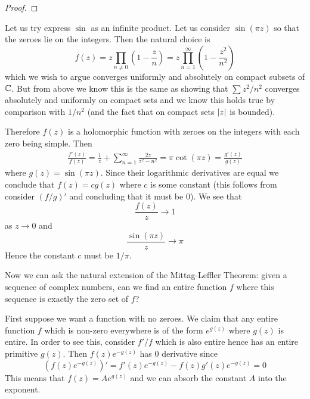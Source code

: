 \begin{proof}
\end{proof}

Let us try express $\sin$ as an infinite product. Let us consider $\sin(\pi z)$ so that the zeroes lie on the integers. Then the natural choice is 
$$f(z) = z\prod_{n \neq 0} \left(1 - \frac{z}{n} \right) = z \prod_{n = 1}^\infty \left( 1 - \frac{z^2}{n^2} \right)$$
which we wish to argue converges uniformly and absolutely on compact subsets of $\mathbb{C}$. But from above we know this is the same as showing that $\sum z^2/n^2$ converges absolutely and uniformly on compact sets and we know this holds true by comparison with $1/n^2$ (and the fact that on compact sets $\left|z\right|$ is bounded).

Therefore $f(z)$ is a holomorphic function with zeroes on the integers with each zero being simple. Then
\begin{align*}
    \frac{f'(z)}{f(z)} = \frac{1}{z} + \sum_{n = 1}^\infty \frac{2z}{z^2 - n^2} = \pi \cot(\pi z) = \frac{g'(z)}{g(z)}
\end{align*}
where $g(z) = \sin (\pi z)$. Since their logarithmic derivatives are equal we conclude that $f(z) = c g(z)$ where $c$ is some constant (this follows from consider $(f/g)'$ and concluding that it must be 0). We see that 
$$\frac{f(z)}{z} \to 1$$
as $z \to 0$ and 
$$\frac{\sin(\pi z)}{z} \to \pi$$
Hence the constant $c$ must be $1/\pi$. 

Now we can ask the natural extension of the Mittag-Leffler Theorem: given a sequence of complex numbers, can we find an entire function $f$ where this sequence is exactly the zero set of $f$? 

First suppose we want a function with no zeroes. We claim that any entire function $f$ which is non-zero everywhere is of the form $e^{g(z)}$ where $g(z)$ is entire. In order to see this, consider $f'/f$ which is also entire hence has an entire primitive $g(z)$. Then $f(z) e^{-g(z)}$ has 0 derivative since 
$$(f(z) e^{-g(z)})' = f'(z) e^{-g(z)}  - f(z) g'(z) e^{-g(z)} = 0$$
This means that $f(z) = A e^{g(z)}$ and we can absorb the constant $A$ into the exponent. 

